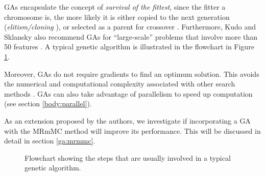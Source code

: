 \documentclass[12pt, twoside, a4paper]{report}
\begin{document}
GAs encapsulate the concept of \textit{survival of the fittest}, since the fitter a chromosome is, the more likely it is either copied to the next generation (\textit{elitism/cloning} \cite{RefWorks:202, RefWorks:212, RefWorks:227}), or selected as a parent for crossover \cite{RefWorks:209}. Furthermore, Kudo and Sklansky also recommend GAs for ``large-scale'' problems that involve more than 50 features \cite{RefWorks:210}. A typical genetic algorithm is illustrated in the flowchart in Figure \ref{bg:fs:ga:flowchart}.

Moreover, GAs do not require gradients to find an optimum solution. This avoids the numerical and computational complexity associated with other search methods \cite{RefWorks:242}. GAs can also take advantage of parallelism to speed up computation (see section \ref{body:parallel}).

As an extension proposed by the authors, we investigate if incorporating a GA with the MRmMC method will improve its performance. This will be discussed in detail in section \ref{ga:mrmmc}.

\begin{figure}
\centering
{}
\caption{Flowchart showing the steps that are usually involved in a typical genetic algorithm.}
\label{bg:fs:ga:flowchart}
\end{figure}
\end{document}
